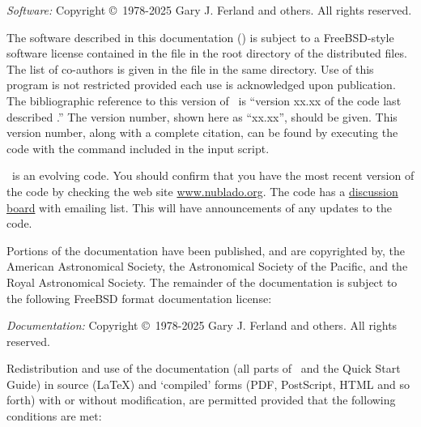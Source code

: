 {\small
\noindent
{\em Software:} Copyright \copyright\ 1978-2025 Gary J. Ferland and others. All rights reserved.

\vspace{1em}

\noindent
The software described in this documentation (\Cloudy) is subject
to a FreeBSD-style software license
contained in the file  in the
root directory of the distributed files.
The list of co-authors is given in the file
 in the same directory.
Use of this program is not restricted provided each use is
acknowledged upon publication.
The bibliographic reference to this version of \Cloudy\ is
``version xx.xx
of the code last described \citet{CloudyReview}.''
The version number, shown here as ``xx.xx'', should be
given.
This version number, along with a complete citation,
can be found by executing the code with the 
 command included in the input script.

\vspace{1em}

\noindent
\Cloudy\ is an evolving code.
You should confirm that you have the most recent
version of the code by checking the web site
\href{http://www.nublado.org}{www.nublado.org}.
The code has a
\href{https://cloudyastrophysics.groups.io}{discussion board} with emailing list.
This will have announcements of any updates to the code.\par

\vspace{1em}

\noindent
Portions of the documentation have been published, and are copyrighted by, the
American Astronomical Society, the Astronomical Society of the Pacific, and
the Royal Astronomical Society. The remainder of the documentation is subject
to the following FreeBSD format documentation license:

\vspace{1em}

\noindent
\iffalse The string 1978-20?? is updated using sed. Do not change - to -- \fi
{\em Documentation:} Copyright \copyright\ 1978-2025 Gary J. Ferland and others. All rights reserved.

\vspace{1em}

\noindent
Redistribution and use of the documentation (all parts of \Hazy\ and the
Quick Start Guide) in source (\LaTeX) and `compiled' forms (PDF, PostScript,
HTML and so forth) with or without modification, are permitted provided that
the following conditions are met:

}
